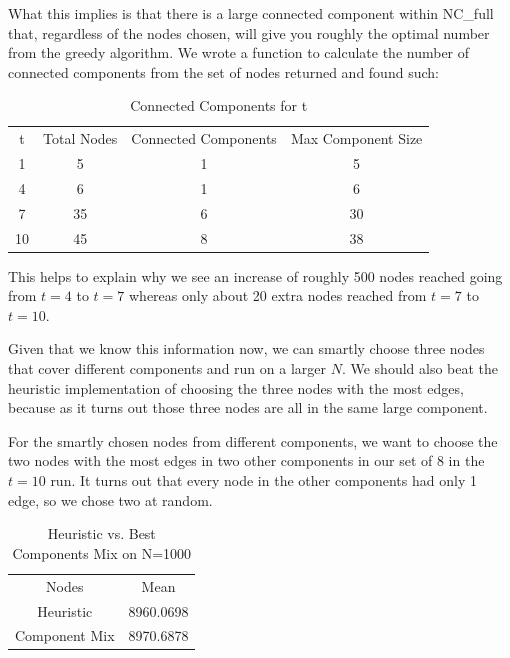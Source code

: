 \documentclass{article}
\begin{document}
		What this implies is that there is a large connected component within NC\_full that, regardless of the nodes chosen, will give you roughly the optimal number from the greedy algorithm. We wrote a function to calculate the number of connected components from the set of nodes returned and found such:

		\begin{table}[h!]
		  \begin{center}
		    \caption{Connected Components for t}
		    \label{tab:table3}
		    \begin{tabular}{|c|c|c|c|} 
		      \hline
		      t & Total Nodes & Connected Components & Max Component Size\\
		      1  & 5 & 1 & 5\\
		      4  & 6 & 1 & 6\\
		      7  & 35 & 6 & 30\\
		      10 & 45 & 8 & 38\\
		      \hline
		    \end{tabular}
		  \end{center}
		\end{table}

		This helps to explain why we see an increase of roughly 500 nodes reached going from $t=4$ to $t=7$ whereas only about 20 extra nodes reached from $t=7$ to $t=10$. 

		Given that we know this information now, we can smartly choose three nodes that cover different components and run on a larger $N$. We should also beat the heuristic implementation of choosing the three nodes with the most edges, because as it turns out those three nodes are all in the same large component.

		For the smartly chosen nodes from different components, we want to choose the two nodes with the most edges in two other components in our set of 8 in the $t=10$ run. It turns out that every node in the other components had only 1 edge, so we chose two at random.

		\begin{table}[h!]
		  \begin{center}
		    \caption{Heuristic vs. Best Components Mix on N=1000}
		    \label{tab:table4}
		    \begin{tabular}{|c|c|} 
		      \hline
		      Nodes & Mean\\
		      Heuristic & 8960.0698 \\
		      Component Mix & 8970.6878 \\
		      \hline
		    \end{tabular}
		  \end{center}
		\end{table}
\end{document}
